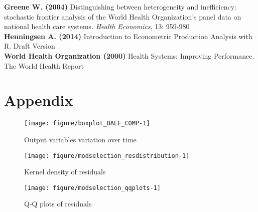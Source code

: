 \documentclass[12pt,a4paper]{article}\usepackage[]{graphicx}\usepackage[]{color}
\newenvironment{knitrout}{}{} %
\begin{document}
\textbf{Greene W. (2004)} Distinguishing between heterogeneity and inefficiency: stochastic frontier analysis of the World Health Organization's panel data on national health care systems. \textit{Health Economics}, 13: 959-980 \\

\textbf{Henningsen A. (2014)} Introduction to Econometric Production Analysis with R. Draft Version \\

\textbf{World Health Organization (2000)} Health Systems: Improving Performance. The World Health Report



\newpage
\section{Appendix}


\begin{knitrout}
\color{fgcolor}\begin{figure}[htbp]

{\centering \texttt{[image: figure/boxplot\_DALE\_COMP-1]} 

}

\caption[Output variables variation over time]{Output variables variation over time}\label{fig:boxplot_DALE_COMP}
\end{figure}


\end{knitrout}

\begin{knitrout}
\color{fgcolor}\begin{figure}[htbp]

{\centering \texttt{[image: figure/modselection\_resdistribution-1]} 

}

\caption[Kernel density of residuals]{Kernel density of residuals}\label{fig:modselection_resdistribution}
\end{figure}


\end{knitrout}

\begin{knitrout}
\color{fgcolor}\begin{figure}[htbp]

{\centering \texttt{[image: figure/modselection\_qqplots-1]} 

}

\caption[Q-Q plots of residuals]{Q-Q plots of residuals}\label{fig:modselection_qqplots}
\end{figure}


\end{knitrout}



\end{document}
